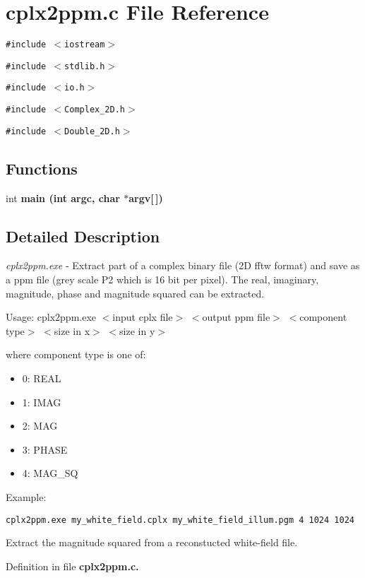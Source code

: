 \section{cplx2ppm.c File Reference}
\label{cplx2ppm_8c}
{\tt \#include $<$iostream$>$}\par
{\tt \#include $<$stdlib.h$>$}\par
{\tt \#include $<$io.h$>$}\par
{\tt \#include $<$Complex\_\-2D.h$>$}\par
{\tt \#include $<$Double\_\-2D.h$>$}\par
\subsection*{Functions}
\begin{CompactItemize}
\item 
int \bf{main} (int argc, char $\ast$argv[$\,$])\label{cplx2ppm_8c_28052c36c3b61c6c0eaa18f5d226118f}

\end{CompactItemize}


\subsection{Detailed Description}
{\em cplx2ppm.exe\/} - Extract part of a complex binary file (2D fftw format) and save as a ppm file (grey scale P2 which is 16 bit per pixel). The real, imaginary, magnitude, phase and magnitude squared can be extracted.

\begin{Desc}
\item[Usage: cplx2ppm.exe $<$input cplx file$>$ $<$output ppm file$>$ $<$component type$>$ $<$size in x$>$ $<$size in y$>$ ]\end{Desc}
\begin{Desc}
\item[]where component type is one of:\begin{itemize}
\item 0: REAL\item 1: IMAG\item 2: MAG\item 3: PHASE\item 4: MAG\_\-SQ\end{itemize}
\end{Desc}
\begin{Desc}
\item[Example:]

\footnotesize\begin{verbatim}cplx2ppm.exe my_white_field.cplx my_white_field_illum.pgm 4 1024 1024 \end{verbatim}
\normalsize
 Extract the magnitude squared from a reconstucted white-field file. \end{Desc}


Definition in file \bf{cplx2ppm.c}.